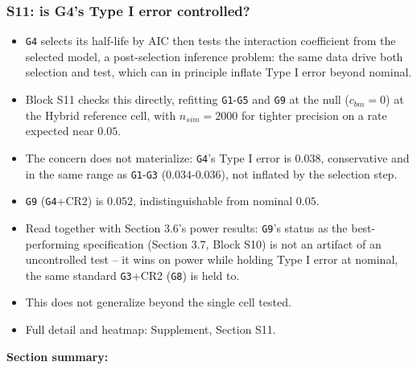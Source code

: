 \documentclass[
  11pt,
]{article}
\providecommand{\tightlist}{%
  \setlength{\itemsep}{0pt}\setlength{\parskip}{0pt}}
\begin{document}
\subsubsection{S11: is G4's Type I error controlled?}\label{s11-is-g4s-type-i-error-controlled}

\begin{itemize}
\tightlist
\item
  \texttt{G4} selects its half-life by AIC then tests the interaction
  coefficient from the selected model, a post-selection inference
  problem: the same data drive both selection and test, which can in
  principle inflate Type I error beyond nominal.
\item
  Block S11 checks this directly, refitting \texttt{G1}-\texttt{G5} and \texttt{G9} at the
  null (\(c_{bm}=0\)) at the Hybrid reference cell, with \(n_{sim}=2000\)
  for tighter precision on a rate expected near \(0.05\).
\item
  The concern does not materialize: \texttt{G4}'s Type I error is \(0.038\),
  conservative and in the same range as \texttt{G1}-\texttt{G3} (\(0.034\)-\(0.036\)),
  not inflated by the selection step.
\item
  \texttt{G9} (\texttt{G4}+CR2) is \(0.052\), indistinguishable from nominal \(0.05\).
\item
  Read together with Section 3.6's power results: \texttt{G9}'s status as
  the best-performing specification (Section 3.7, Block S10) is not
  an artifact of an uncontrolled test -- it wins on power while
  holding Type I error at nominal, the same standard \texttt{G3}+CR2 (\texttt{G8})
  is held to.
\item
  This does not generalize beyond the single cell tested.
\item
  Full detail and heatmap: Supplement, Section S11.
\end{itemize}

\textbf{Section summary:}
\end{document}
